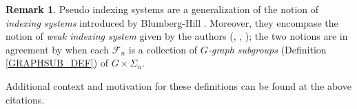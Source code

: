 \documentclass[a4paper,10pt
,draft
]{article}%
\numberwithin{equation}{section}
\numberwithin{figure}{section}
\newtheorem{lemma}[equation]{Lemma}%
\theoremstyle{definition} %
\newtheorem{remark}[equation]{Remark}%
\newcommand{\set}[1]{\left\{#1\right\}}%
\newcommand{\vect}[1]{\text{\overrightharp{\ensuremath{#1}}}}
\newcommand{\F}{\ensuremath{\mathcal F}}
\newcommand{\1}{\ensuremath{\mathbbm 1}}%
\begin{document}
\begin{remark}
      Pseudo indexing systems are a generalization of the notion of \textit{indexing systems} introduced by Blumberg-Hill \cite[Defn. 3.22]{BH15}.
      Moreover, they encompase the notion of \textit{weak indexing system} given by the authors
      (\cite[Defn. 9.5]{Per18}, \cite[Defn. 4.49]{BP_geo}, \cite[Defn. 6.2]{BP_edss});
      the two notions are in agreement by \cite[Remark 6.45]{BP_geo} when each $\F_n$ is a collection of \textit{$G$-graph subgroups} (Definition \ref{GRAPHSUB_DEF}) of $G \times \Sigma_n$.

      Additional context and motivation for these definitions can be found at the above citations.
\end{remark}

\end{document}
